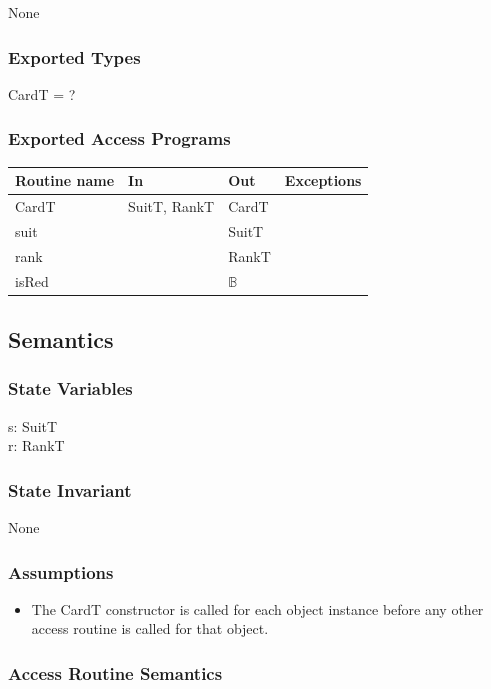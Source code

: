 \documentclass[12pt]{article}
\begin{document}
None

\subsubsection*{Exported Types}

CardT = ?

\subsubsection*{Exported Access Programs}

\begin{tabular}{| l | l | l | l |}
\hline
\textbf{Routine name} & \textbf{In} & \textbf{Out} & \textbf{Exceptions}\\
\hline
CardT & SuitT, RankT & CardT & \\
\hline
suit & ~ & SuitT & ~\\
\hline
rank & ~ & RankT & ~\\
\hline
isRed & ~ & $\mathbb{B}$ & ~\\
\hline
\end{tabular}

\subsection*{Semantics}

\subsubsection*{State Variables}

s: SuitT\\
r: RankT

\subsubsection*{State Invariant}

None

\subsubsection*{Assumptions}

\begin{itemize}
    \item The CardT constructor is called for each object instance before
        any other access routine is called for that object.
\end{itemize}

\subsubsection*{Access Routine Semantics}
\end{document}
